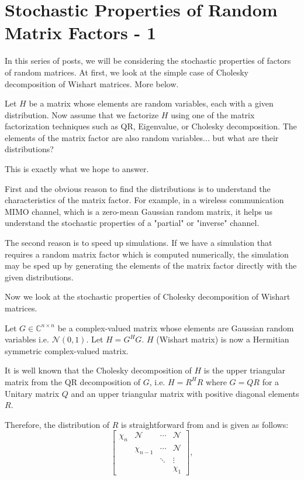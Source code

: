 \section{Stochastic Properties of Random Matrix Factors - 1}
In this series of posts, we will be considering the stochastic properties of factors of random matrices. At first, we look at the simple case of Cholesky decomposition of Wishart matrices. More below.

Let $H$ be a matrix whose elements are random variables, each with a given distribution. Now assume that we factorize $H$ using one of the matrix factorization techniques such as QR, Eigenvalue, or Cholesky decomposition. The elements of the matrix factor are also random variables... but what are their distributions?

This is exactly what we hope to answer.

First and the obvious reason to find the distributions is to understand the characteristics of the matrix factor. For example, in a wireless communication MIMO channel, which is a zero-mean Gaussian random matrix, it helps us understand the stochastic properties of a "partial" or "inverse" channel.

The second reason is to speed up simulations. If we have a simulation that requires a random matrix factor which is computed numerically, the simulation may be sped up by generating the elements of the matrix factor directly with the given distributions.

Now we look at the stochastic properties of Cholesky decomposition of Wishart matrices.

Let $G \in \mathbb{C}^{n \times n}$ be a complex-valued matrix whose elements are Gaussian random variables i.e. $\mathcal{N}(0,1)$. Let $H = G^H G$. $H$ (Wishart matrix) is now a Hermitian symmetric complex-valued matrix.

It is well known that the Cholesky decomposition of $H$ is the upper triangular matrix from the QR decomposition of $G$, i.e. $H = R^H R$ where $G = QR$ for a Unitary matrix $Q$ and an upper triangular matrix with positive diagonal elements $R$.

Therefore, the distribution of $R$ is straightforward from \cite{Edelman2005} and is given as follows:
$$
\begin{bmatrix}
	\chi_n & \mathcal{N} & \cdots & \mathcal{N} \\
	& \chi_{n-1} & \cdots & \mathcal{N} \\
	&                   & \ddots & \vdots \\
	&                   &            & \chi_1
\end{bmatrix},
$$

